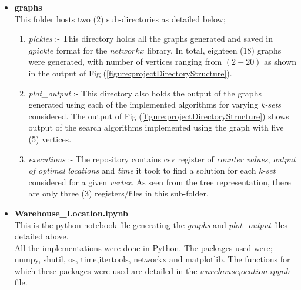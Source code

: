 \documentclass[longpaper, english, final, times]{revdetua}
\begin{document}
		\begin{itemize}
			\setlength\itemsep{1em}
			\item \textbf{graphs} \\
				This folder hosts two (2) sub-directories as detailed below; 
				\begin{enumerate}
					\item \emph{pickles} :- This directory holds all the graphs generated and saved in $gpickle$ format for the $networkx$ library. In total, eighteen (18) graphs were generated, with number of vertices ranging from $(2-20)$ as shown in the output of Fig (\ref{figure:projectDirectoryStructure}).
					\item \emph{plot\_output} :- This directory also holds the output of the graphs generated using each of the implemented algorithms for varying \emph{k-sets} considered. The output of Fig (\ref{figure:projectDirectoryStructure}) shows output of the search algorithms implemented using the graph with five (5) vertices.
					\item \emph{executions} :- The repository contains csv register of \textit{counter values}, \textit{output of optimal locations} and \textit{time} it took to find a solution for each \emph{k-set} considered for a given \textit{vertex}. As seen from the tree representation, there are only three (3) registers/files in this sub-folder.
				\end{enumerate}
			
			\item \textbf{Warehouse\_Location.ipynb} \\			
			This is the python notebook file generating the \textit{graphs} and \textit{plot\_output} files detailed above. \\
						
			All the implementations were done in Python. The packages used were; numpy, shutil, os, time,itertools, networkx and matplotlib. The functions for which these packages were used are detailed in the $warehouse_location.ipynb$ file.
			

\end{itemize}
\end{document}
